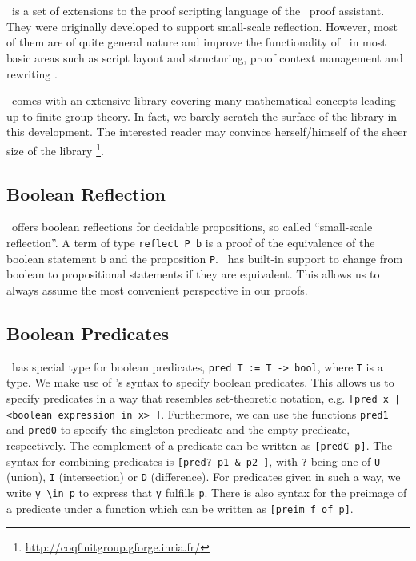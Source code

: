 \section{\ssreflect}


\ssreflect\ is a set of extensions to the proof scripting language of the \coq\ proof assistant. 
They were originally developed to support small-scale reflection. 
However, most of them are of quite general nature and improve the functionality of \coq\ in most basic areas such as script layout and structuring, proof context management and rewriting \cite{gonthier:inria-00258384}.

\ssreflect\ comes with an extensive library \cite{gonthier:inria-00139131} covering many mathematical concepts leading up to finite group theory.
In fact, we barely scratch the surface of the library in this development. 
The interested reader may convince herself/himself of the sheer size of the library%
\footnote{\url{http://coqfinitgroup.gforge.inria.fr/}}.

\subsection{Boolean Reflection}
\ssreflect\ offers boolean reflections for decidable propositions, so called ``small-scale reflection''.
A term of type \lstinline{reflect P b} is a proof of the equivalence of the boolean statement \lstinline{b} and the proposition \lstinline{P}.
\ssreflect\ has built-in support to change from boolean to propositional statements if they are equivalent. 
This allows us to always assume the most convenient perspective in our proofs.


\subsection{Boolean Predicates}
\ssreflect\ has special type for boolean predicates, \lstinline{pred T := T -> bool}, where \lstinline{T} is a type.
We make use of \ssreflect's syntax to specify boolean predicates.
This allows us to specify predicates in a way that resembles set-theoretic notation, e.g. 
\lstinline{[pred x | <boolean expression in x> ]}.
Furthermore, we can use the functions \lstinline{pred1} and \lstinline{pred0} to specify the singleton predicate and the empty predicate, respectively.
The complement of a predicate can be written as \lstinline{[predC p]}. 
The syntax for combining predicates is \lstinline{[pred? p1 & p2 ]}, with \lstinline{?} being one of 
\lstinline{U} (union), \lstinline{I} (intersection) or \lstinline{D} (difference).
For predicates given in such a way, we write \lstinline{y \in p} to express that \lstinline{y} fulfills \lstinline{p}.
There is also syntax for the preimage of a predicate under a function
which can be written as \lstinline{[preim f of p]}.

